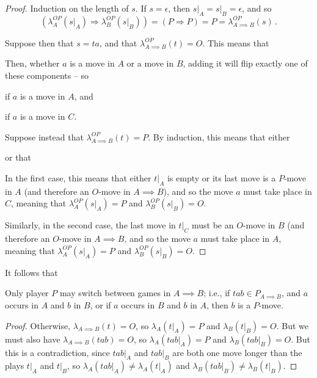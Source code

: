 \begin{proof}
  Induction on the length of $s$.
  If $s=\epsilon$, then $s\vert_A=s\vert_B=\epsilon$, and so 
  \[
    (\lambda_A^{OP}(s\vert_A)\Rightarrow \lambda_B^{OP}(s\vert_B)) = (P\Rightarrow P) = P = \lambda_{A\implies B}^{OP}(s)\,.
    \]

  Suppose then that $s=ta$, and that $\lambda_{A\implies B}^{OP}(t)=O$.  
  This means that
  Then, whether $a$ is a move in $A$ or a move in $B$, adding it will flip exactly one of these components -- so 
  if $a$ is a move in $A$, and 
  if $a$ is a move in $C$.

  Suppose instead that $\lambda_{A\implies B}^{OP}(t)=P$.  
  By induction, this means that either 
  or that 
  In the first case, this means that either $t\vert_A$ is empty or its last move is a $P$-move in $A$ (and therefore an $O$-move in $A\implies B$), and so the move $a$ must take place in $C$, meaning that $\lambda_A^{OP}(s\vert_A)=P$ and $\lambda_B^{OP}(s\vert_B)=O$.  

  Similarly, in the second case, the last move in $t\vert_C$ must be an $O$-move in $B$ (and therefore an $O$-move in $A\implies B$, and so the move $a$ must take place in $A$, meaning that $\lambda_A^{OP}(s\vert_A)=P$ and $\lambda_B^{OP}(s\vert_B)=O$.  
\end{proof}

It follows that

\begin{corollary}
  Only player $P$ may switch between games in $A\implies B$; i.e., if $tab\in P_{A\implies B}$, and $a$ occurs in $A$ and $b$ in $B$, or if $a$ occurs in $B$ and $b$ in $A$, then $b$ is a $P$-move.
  \label{CorSwitchingCondition}
\end{corollary}
\begin{proof}
  Otherwise, $\lambda_{A\implies B}(t)=O$, so $\lambda_A(t\vert_A)=P$ and $\lambda_B(t\vert_B)=O$.  
  But we must also have $\lambda_{A\implies B}(tab)=O$, so $\lambda_A(tab\vert_A)=P$ and $\lambda_B(tab\vert_B)=O$.  
  But this is a contradiction, since $tab\vert_A$ and $tab\vert_B$ are both one move longer than the plays $t\vert_A$ and $t\vert_B$, so $\lambda_A(tab\vert_A) \ne \lambda_A(t\vert_A)$ and $\lambda_B(tab\vert_B)\ne \lambda_B(t\vert_B)$.
\end{proof}

